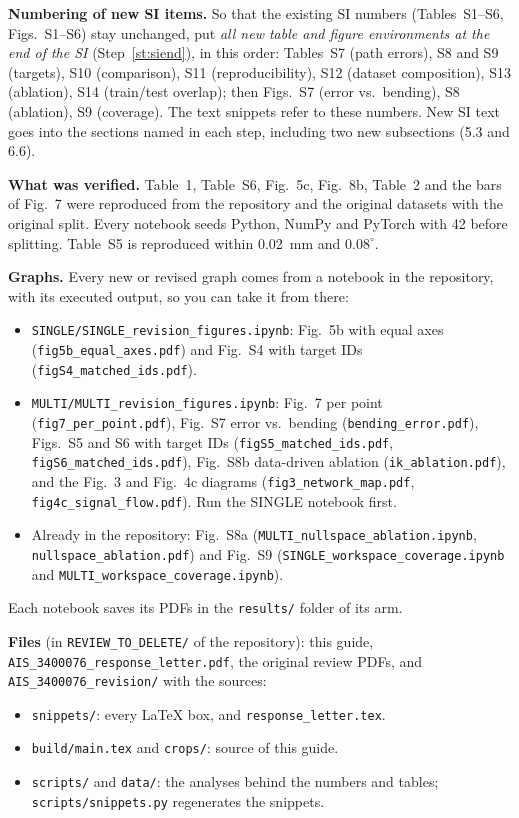 \documentclass[10pt,a4paper]{article}
\newcommand{\st}[1]{Step~\ref{#1}}
\begin{document}
\textbf{Numbering of new SI items.} So that the existing SI numbers (Tables~S1--S6, Figs.~S1--S6) stay unchanged, put \emph{all new table and figure environments at the end of the SI} (\st{st:siend}), in this order: Tables~S7 (path errors), S8 and S9 (targets), S10 (comparison), S11 (reproducibility), S12 (dataset composition), S13 (ablation), S14 (train/test overlap); then Figs.~S7 (error vs.\ bending), S8 (ablation), S9 (coverage). The text snippets refer to these numbers. New SI text goes into the sections named in each step, including two new subsections (5.3 and 6.6).

\textbf{What was verified.} Table~1, Table~S6, Fig.~5c, Fig.~8b, Table~2 and the bars of Fig.~7 were reproduced from the repository and the original datasets with the original split. Every notebook seeds Python, NumPy and PyTorch with 42 before splitting. Table~S5 is reproduced within 0.02~mm and $0.08^\circ$.

\textbf{Graphs.} Every new or revised graph comes from a notebook in the repository, with its executed output, so you can take it from there:
\begin{itemize}
\item \texttt{SINGLE/SINGLE\_revision\_figures.ipynb}: Fig.~5b with equal axes (\texttt{fig5b\_equal\_axes.pdf}) and Fig.~S4 with target IDs (\texttt{figS4\_matched\_ids.pdf}).
\item \texttt{MULTI/MULTI\_revision\_figures.ipynb}: Fig.~7 per point (\texttt{fig7\_per\_point.pdf}), Fig.~S7 error vs.\ bending (\texttt{bending\_error.pdf}), Figs.~S5 and S6 with target IDs (\texttt{figS5\_matched\_ids.pdf}, \texttt{figS6\_matched\_ids.pdf}), Fig.~S8b data-driven ablation (\texttt{ik\_ablation.pdf}), and the Fig.~3 and Fig.~4c diagrams (\texttt{fig3\_network\_map.pdf}, \texttt{fig4c\_signal\_flow.pdf}). Run the SINGLE notebook first.
\item Already in the repository: Fig.~S8a (\texttt{MULTI\_nullspace\_ablation.ipynb}, \texttt{nullspace\_ablation.pdf}) and Fig.~S9 (\texttt{SINGLE\_workspace\_coverage.ipynb} and \texttt{MULTI\_workspace\_coverage.ipynb}).
\end{itemize}
Each notebook saves its PDFs in the \texttt{results/} folder of its arm.

\textbf{Files} (in \texttt{REVIEW\_TO\_DELETE/} of the repository): this guide, \texttt{AIS\_3400076\_response\_letter.pdf}, the original review PDFs, and \texttt{AIS\_3400076\_revision/} with the sources:
\begin{itemize}
\item \texttt{snippets/}: every LaTeX box, and \texttt{response\_letter.tex}.
\item \texttt{build/main.tex} and \texttt{crops/}: source of this guide.
\item \texttt{scripts/} and \texttt{data/}: the analyses behind the numbers and tables; \texttt{scripts/snippets.py} regenerates the snippets.
\end{itemize}
\end{document}

